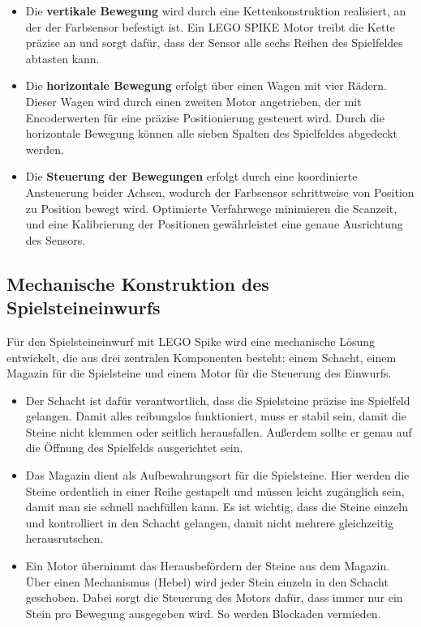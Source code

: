 \begin{itemize}
	\item Die \textbf{vertikale Bewegung} wird durch eine Kettenkonstruktion realisiert, an der der Farbsensor befestigt ist. Ein LEGO SPIKE Motor treibt die Kette präzise an und sorgt dafür, dass der Sensor alle sechs Reihen des Spielfeldes abtasten kann. 
	\item Die \textbf{horizontale Bewegung} erfolgt über einen Wagen mit vier Rädern. Dieser Wagen wird durch einen zweiten Motor angetrieben, der mit Encoderwerten für eine präzise Positionierung gesteuert wird. Durch die horizontale Bewegung können alle sieben Spalten des Spielfeldes abgedeckt werden.
	\item Die \textbf{Steuerung der Bewegungen} erfolgt durch eine koordinierte Ansteuerung beider Achsen, wodurch der Farbsensor schrittweise von Position zu Position bewegt wird. Optimierte Verfahrwege minimieren die Scanzeit, und eine Kalibrierung der Positionen gewährleistet eine genaue Ausrichtung des Sensors.
\end{itemize}

\subsection{Mechanische Konstruktion des Spielsteineinwurfs}

Für den Spielsteineinwurf mit LEGO Spike wird eine mechanische Lösung entwickelt, die aus drei zentralen Komponenten besteht: einem Schacht, einem Magazin für die Spielsteine und einem Motor für die Steuerung des Einwurfs.

\begin{itemize}
	\item Der Schacht ist dafür verantwortlich, dass die Spielsteine präzise ins Spielfeld gelangen. Damit alles reibungslos funktioniert, muss er stabil sein, damit die Steine nicht klemmen oder seitlich herausfallen. Außerdem sollte er genau auf die Öffnung des Spielfelds ausgerichtet sein.
	\item Das Magazin dient als Aufbewahrungsort für die Spielsteine. Hier werden die Steine ordentlich in einer Reihe gestapelt und müssen leicht zugänglich sein, damit man sie schnell nachfüllen kann. Es ist wichtig, dass die Steine einzeln und kontrolliert in den Schacht gelangen, damit nicht mehrere gleichzeitig herausrutschen.
	\item Ein Motor übernimmt das Herausbefördern der Steine aus dem Magazin. Über einen Mechanismus (Hebel) wird jeder Stein einzeln in den Schacht geschoben. Dabei sorgt die Steuerung des Motors dafür, dass immer nur ein Stein pro Bewegung ausgegeben wird. So werden Blockaden vermieden.
\end{itemize}
